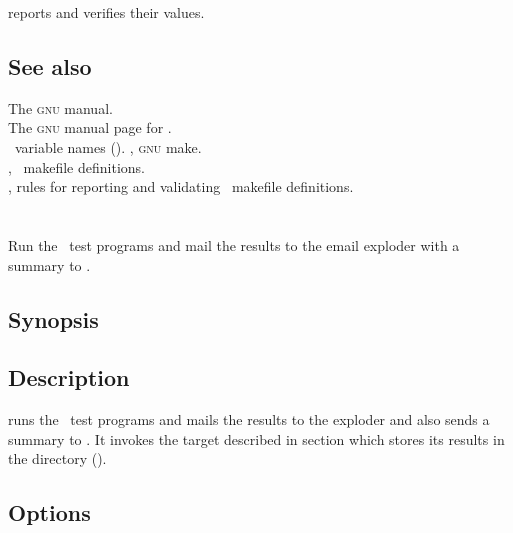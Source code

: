 \noindent
reports and verifies their values.

\subsection*{See also}

The \textsc{gnu}  manual.\\
The \textsc{gnu} manual page for .\\
\aipspp\ variable names ().
, \textsc{gnu} make.\\
, \aipspp\ makefile definitions.\\
, rules for reporting and validating \aipspp\ makefile
   definitions.

 
\newpage
\section{}
\label{runtests}
 
Run the \aipspp\ test programs and mail the results to the 
email exploder with a summary to .
 
\subsection*{Synopsis}
 
\begin{synopsis}
\end{synopsis}
 
\subsection*{Description}
 
 runs the \aipspp\ test programs and mails the results to the
 exploder and also sends a summary to .
It invokes the  target described in section  which stores its results in the 
directory ().
 
\subsection*{Options}
 
